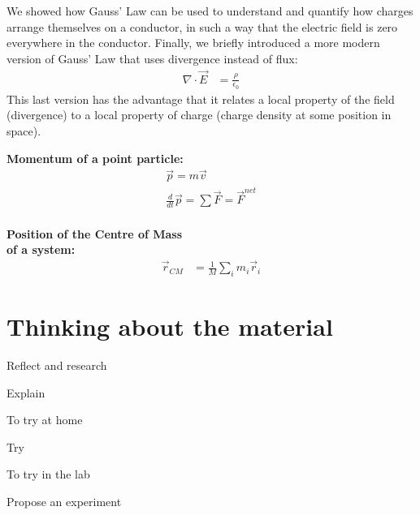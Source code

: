 \begin{chapterSummary}
\begin{enumerate}
\end{enumerate}
We showed how Gauss' Law can be used to understand and quantify how charges arrange themselves on a conductor, in such a way that the electric field is zero everywhere in the conductor. Finally, we briefly introduced a more modern version of Gauss' Law that uses divergence instead of flux:
\begin{align*}
\nabla \cdot \vec E &= \frac{\rho}{\epsilon_0}
\end{align*}
This last version has the advantage that it relates a local property of the field (divergence) to a local property of charge (charge density at some position in space). 




\end{chapterSummary}

\newpage
\begin{importantEquations}
\medskip
\begin{multicols}{2}
\textbf{Momentum of a point particle:}
\begin{align*}
\vec p = m\vec v \\
\frac{d}{dt}\vec p = \sum \vec F = \vec F^{net}
\end{align*}
\columnbreak
\\
\textbf{Position of the Centre of Mass \\ of a system:}
\begin{align*}
\vec r_{CM} &=\frac{1}{M}\sum_i m_i\vec r_i 
\end{align*}
\medskip
\end{multicols}
\end{importantEquations}

\newpage
\section{Thinking about the material}

\begin{chapteractivity}{Reflect and research}
{
\item Explain
}
\end{chapteractivity}

\begin{chapteractivity}{To try at home}
{
\item Try
}
\end{chapteractivity}

\begin{chapteractivity}{To try in the lab}
{
\item Propose an experiment
}
\end{chapteractivity}

